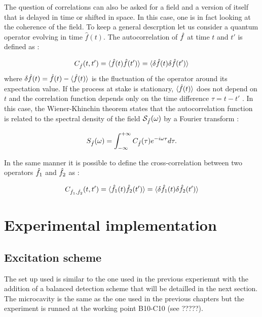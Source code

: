 The question of correlations can also be asked for a field and a version of itself that is delayed in time or shifted in space. In this case, one is in fact looking at the coherence of the field. 
To keep a general descrption let us consider a quantum operator evolving in time $\hat{f}(t)$. The autocorrelation of $\hat{f}$ at time $t$ and $t'$ is defined as :

\begin{equation}
    \label{eq:autocorr}
    C_{\hat{f}}(t,t') = \langle \hat{f}(t)\hat{f}(t') \rangle = \langle \delta \hat{f}(t) \delta \hat{f}(t') \rangle
\end{equation}
where $\delta \hat{f}(t) = \hat{f}(t) - \langle \hat{f}(t) \rangle$ is the fluctuation of the operator around its expectation value. If the process at stake 
is stationary, $\langle \hat{f}(t) \rangle$ does not depend on $t$ and the correlation function depends only on the time difference $\tau= t-t'$ \cite{bachor_guide_1998}. In this case,
the Wiener-Khinchin theorem states that the autocorrelation function is related to the spectral density of the field $\mathcal{S}_{\hat{f}}(\omega)$ by a Fourier transform \cite{fabre_houches_97} :

\begin{equation}
    \label{eq:autocorr_spectral}
    S_{\hat{f}}(\omega) = \int_{-\infty}^{+\infty} C_{\hat{f}}(\tau) e^{-i\omega \tau} d\tau.
\end{equation}

In the same manner it is possible to define the cross-correlation between two operators $\hat{f}_1$ and $\hat{f}_2$ as :

\begin{equation}
    \label{eq:crosscorr}
    C_{\hat{f}_1,\hat{f}_2}(t,t') = \langle \hat{f}_1(t)\hat{f}_2(t') \rangle = \langle \delta \hat{f}_1(t) \delta \hat{f}_2(t') \rangle
\end{equation}

\section{Experimental implementation}
\label{sec:exp_impl}


\subsection{Excitation scheme}

The set up used is similar to the one used in the previous experiemnt with the addition of a balanced detection scheme that will be detailled in the next section. 
The microcavity is the same as the one used in the previous chapters but the experiment is runned at the working point B10-C10 (see ?????).

